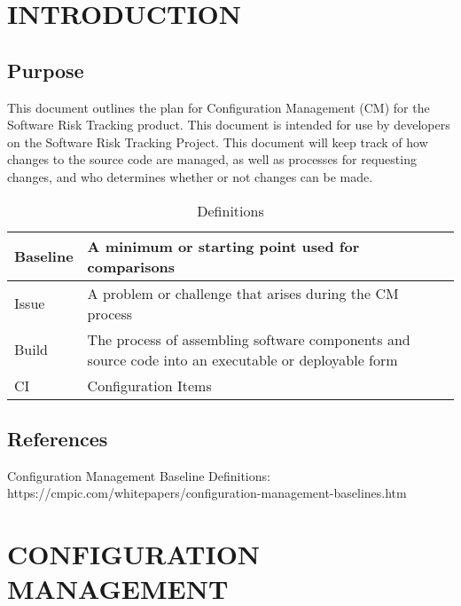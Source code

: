 \documentclass[letterpaper,12pt,oneside,listof=totoc]{scrreprt}
\begin{document}
\chapter{INTRODUCTION}

\section{Purpose}

This document outlines the plan for Configuration Management (CM) for the Software Risk Tracking product. This document is intended for use by developers on the Software Risk Tracking Project. This document will keep track of how changes to the source code are managed, as well as processes for requesting changes, and who determines whether or not changes can be made.
\begin{table}[htbp]
\centering
\caption{Definitions}
\begin{tabular}{|p{2.5in}|p{2.5in}|}
    \hline
    Baseline & A minimum or starting point used for comparisons\\
    \hline
    Issue & A problem or challenge that arises during the CM process\\
    \hline
    Build & The process of assembling software components and source code into an executable or deployable form\\
    \hline
    CI & Configuration Items\\
    \hline
\end{tabular}
\label{tab:definitions}
\end{table}

\section{References}

Configuration Management Baseline Definitions: \\
\indent https://cmpic.com/whitepapers/configuration-management-baselines.htm

\chapter{CONFIGURATION MANAGEMENT}

\end{document}
